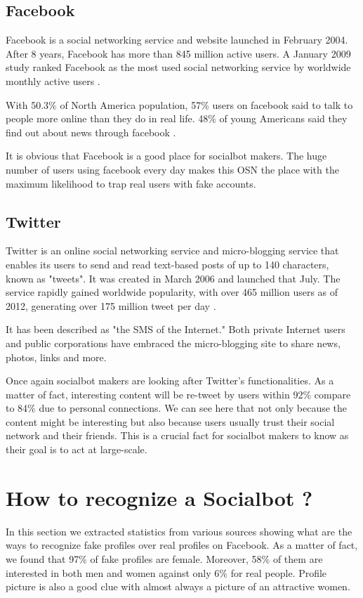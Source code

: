 \documentclass[12pt,a4paper]{article}
\begin{document}
  \subsection{Facebook}
  Facebook is a social networking service and website launched in February 2004. After 8 years,
  Facebook has more than 845 million active users. A January 2009 study ranked Facebook as the
  most used social networking service by worldwide monthly active users
  \cite{wikipedia_facebook}.

  With 50.3\% of North America population, 57\% users on facebook said to talk to people more
  online than they do in real life. 48\% of young Americans said they find out about news
  through facebook \cite{facebook_takes_over_top_spot_twitter_climbs}.

  It is obvious that Facebook is a good place for socialbot makers. The huge number of users
  using facebook every day makes this OSN the place with the maximum likelihood to trap real
  users with fake accounts.

  \subsection{Twitter}
  Twitter is an online social networking service and micro-blogging service that enables its
  users to send and read text-based posts of up to 140 characters, known as "tweets".
  It was created in March 2006 and launched that July. The service rapidly gained worldwide
  popularity, with over 465 million users as of 2012, generating over 175 million tweet per day
  \cite{wikipedia_twitter}.

  It has been described as "the SMS of the Internet." Both private Internet users and public
  corporations have embraced the micro-blogging site to share news, photos, links and more.

  Once again socialbot makers are looking after Twitter's functionalities. As a matter of fact,
  interesting content will be re-tweet by users within 92\% compare to 84\% due to personal
  connections. We can see here that not only because the content might be interesting but also
  because users usually trust their social network and their friends. This is a crucial fact
  for socialbot makers to know as their goal is to act at large-scale.

\section{How to recognize a Socialbot ?}
In this section we extracted statistics from various sources showing what are the ways to
recognize fake profiles over real profiles on Facebook. As a matter of fact, we found that
97\% of fake profiles are female. Moreover, 58\% of them are interested in both men and
women against only 6\% for real people. Profile picture is also a good clue with almost
always a picture of an attractive women.
\end{document}
